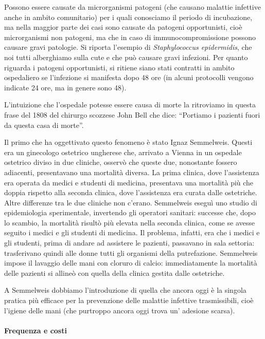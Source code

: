 Possono essere causate da microrganismi patogeni (che causano malattie
infettive anche in ambito comunitario) per i quali conosciamo il periodo
di incubazione, ma nella maggior parte dei casi sono causate da patogeni
opportunisti, cioè microrganismi non patogeni, ma che in caso di
immunocompromissione possono causare gravi patologie. Si riporta
l'esempio di \emph{Staphylococcus epidermidis}, che noi tutti
alberghiamo sulla cute e che può causare gravi infezioni. Per quanto
riguarda i patogeni opportunisti, si ritiene siano stati contratti in
ambito ospedaliero se l'infezione si manifesta dopo 48 ore (in alcuni
protocolli vengono indicate 24 ore, ma in genere sono 48).

L'intuizione che l'ospedale potesse essere causa di morte la ritroviamo
in questa frase del 1808 del chirurgo scozzese John Bell che dice:
``Portiamo i pazienti fuori da questa casa di morte''.

Il primo che ha oggettivato questo fenomeno è stato Ignaz Semmelweis.
Questi era un ginecologo ostetrico ungherese che, arrivato a Vienna in
un ospedale ostetrico diviso in due cliniche, osservò che queste due,
nonostante fossero adiacenti, presentavano una mortalità diversa. La
prima clinica, dove l'assistenza era operata da medici e studenti di
medicina, presentava una mortalità più che doppia rispetto alla seconda
clinica, dove l'assistenza era curata dalle ostetriche. Altre differenze
tra le due cliniche non c'erano. Semmelweis eseguì uno studio di
epidemiologia sperimentale, invertendo gli operatori sanitari: successe
che, dopo lo scambio, la mortalità risultò più elevata nella seconda
clinica, come se avesse seguito i medici e gli studenti di medicina. Il
problema, infatti, era che i medici e gli studenti, prima di andare ad
assistere le pazienti, passavano in sala settoria: trasferivano quindi
alle donne tutti gli organismi della putrefazione. Semmelweis impose il
lavaggio delle mani con cloruro di calcio: immediatamente la mortalità
delle pazienti si allineò con quella della clinica gestita dalle
ostetriche.

A Semmelweis dobbiamo l'introduzione di quella che ancora oggi è la
singola pratica più efficace per la prevenzione delle malattie infettive
trasmissibili, cioè l'igiene delle mani (che purtroppo ancora oggi trova
un' adesione scarsa).

\paragraph{Frequenza e costi}

